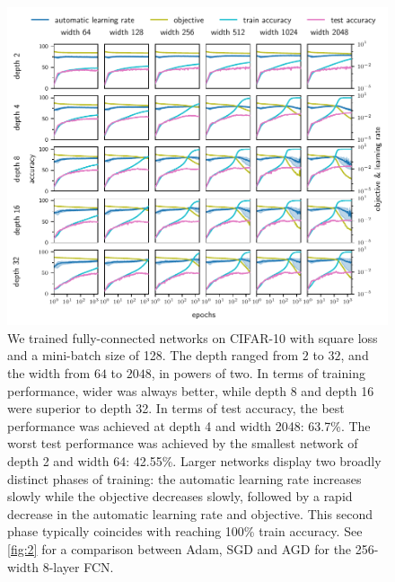 \begin{figure}
    \centering
    \includegraphics[width=\textwidth]{figures/pdf/plots3_0}
    \caption{ We trained fully-connected networks on CIFAR-10 with square loss and a mini-batch size of 128. The depth ranged from $2$ to $32$, and the width from $64$ to $2048$, in powers of two. In terms of training performance, wider was always better, while depth 8 and depth 16 were superior to depth 32. In terms of test accuracy, the best performance was achieved at depth 4 and width 2048: 63.7\%. The worst test performance was achieved by the smallest network of depth 2 and width 64: 42.55\%.
    Larger networks display two broadly distinct phases of training: the automatic learning rate increases slowly while the objective decreases slowly, followed by a rapid decrease in the automatic learning rate and objective. This second phase typically coincides with reaching 100\% train accuracy. See \cref{fig:2} for a comparison between Adam, SGD and AGD for the 256-width 8-layer FCN.} \label{fig:3}
\end{figure}